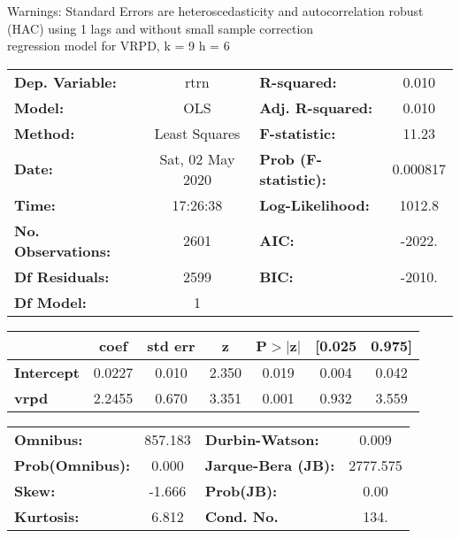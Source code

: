 Warnings: \newline
 [1] Standard Errors are heteroscedasticity and autocorrelation robust (HAC) using 1 lags and without small sample correction\\ 

regression model for VRPD, k = 9 h = 6\begin{center}
\begin{tabular}{lclc}
\toprule
\textbf{Dep. Variable:}    &       rtrn       & \textbf{  R-squared:         } &     0.010   \\
\textbf{Model:}            &       OLS        & \textbf{  Adj. R-squared:    } &     0.010   \\
\textbf{Method:}           &  Least Squares   & \textbf{  F-statistic:       } &     11.23   \\
\textbf{Date:}             & Sat, 02 May 2020 & \textbf{  Prob (F-statistic):} &  0.000817   \\
\textbf{Time:}             &     17:26:38     & \textbf{  Log-Likelihood:    } &    1012.8   \\
\textbf{No. Observations:} &        2601      & \textbf{  AIC:               } &    -2022.   \\
\textbf{Df Residuals:}     &        2599      & \textbf{  BIC:               } &    -2010.   \\
\textbf{Df Model:}         &           1      & \textbf{                     } &             \\
\bottomrule
\end{tabular}
\begin{tabular}{lcccccc}
                   & \textbf{coef} & \textbf{std err} & \textbf{z} & \textbf{P$> |$z$|$} & \textbf{[0.025} & \textbf{0.975]}  \\
\midrule
\textbf{Intercept} &       0.0227  &        0.010     &     2.350  &         0.019        &        0.004    &        0.042     \\
\textbf{vrpd}      &       2.2455  &        0.670     &     3.351  &         0.001        &        0.932    &        3.559     \\
\bottomrule
\end{tabular}
\begin{tabular}{lclc}
\textbf{Omnibus:}       & 857.183 & \textbf{  Durbin-Watson:     } &    0.009  \\
\textbf{Prob(Omnibus):} &   0.000 & \textbf{  Jarque-Bera (JB):  } & 2777.575  \\
\textbf{Skew:}          &  -1.666 & \textbf{  Prob(JB):          } &     0.00  \\
\textbf{Kurtosis:}      &   6.812 & \textbf{  Cond. No.          } &     134.  \\
\bottomrule
\end{tabular}
\end{center}


